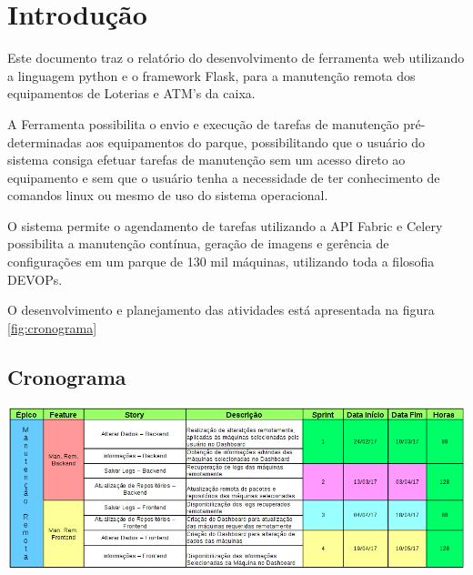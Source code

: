 \chapter[Introdução]{Introdução}
Este documento traz o relatório do desenvolvimento de ferramenta web utilizando a linguagem python e o framework Flask, para a manutenção remota dos equipamentos de Loterias e ATM's da caixa. 

A Ferramenta possibilita o envio e execução de tarefas de manutenção pré-determinadas aos equipamentos do parque, possibilitando que o usuário do sistema consiga efetuar tarefas de manutenção sem um acesso direto ao equipamento e sem que o usuário tenha a necessidade de ter conhecimento de comandos linux ou mesmo de uso do sistema operacional. 

O sistema permite o agendamento de tarefas utilizando a API Fabric e Celery possibilita a manutenção contínua, geração de imagens e gerência de configurações em um parque de 130 mil máquinas, utilizando toda a filosofia DEVOPs.

O desenvolvimento e planejamento das atividades está apresentada na figura \ref{fig:cronograma}
\section{Cronograma}
\begin{center}
    \includegraphics[scale=0.6,angle=90]{figuras/cronograma.png}
    \label{fig:cronograma}
\end{center}
